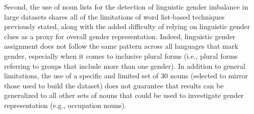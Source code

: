 Second, the use of noun lists for the detection of linguistic gender imbalance in large datasets shares all of the limitations of word list-based techniques previously stated, along with the added difficulty of relying on linguistic gender clues as a proxy for overall gender representation. Indeed, linguistic gender assignment does not follow the same pattern across all languages that mark gender, especially when it comes to inclusive plural forms (i.e., plural forms referring to groups that include more than one gender). In addition to general limitations, the use of a specific and limited set of 30 nouns (selected to mirror those used to build the \holisticbias dataset) does not guarantee that results can be generalized to all other sets of nouns that could be used to investigate gender representation (e.g., occupation nouns).





